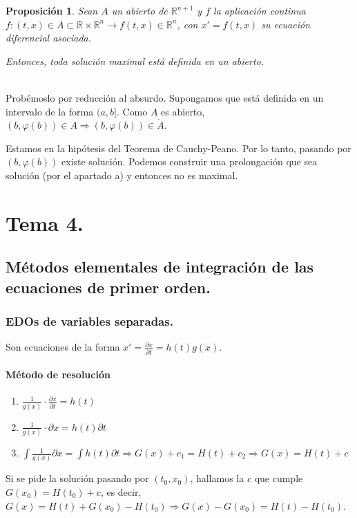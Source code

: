 \documentclass{article}
\makeatletter
\theoremstyle{theorem-style}  %
\newtheorem{proposition}[theorem]{Proposición}
\theoremstyle{definition-style}
\theoremstyle{example-style}
\renewenvironment{proof}[1][\proofname]{\par
	\pushQED{\qed}%
	\normalfont \topsep6\p@\@plus6\p@\relax
	\list{}{%
		\settowidth{\leftmargin}{\quad:\hskip\labelsep}%
		\setlength{\labelwidth}{0pt}%
		\setlength{\itemindent}{-\leftmargin}%
	}%
	\item[\hskip\labelsep\itshape#1\@addpunct{:}]\ignorespaces
}{%
	\popQED\endlist\@endpefalse
}
\makeatother
\begin{document}
\begin{proposition}
	Sean $ A $ un abierto de $ \mathbb{R}^{n+1} $ y $ f $ la aplicación continua $ f:(t,x)\in A\subset \mathbb{R}\times \mathbb{R}^n \longrightarrow f(t,x)\in \mathbb{R}^n $, con $  x'=f(t,x) $ su ecuación diferencial asociada. 
	
	Entonces, toda solución maximal está definida en un abierto.
\end{proposition}
\begin{proof}\ \\
	Probémoslo por reducción al absurdo. Supongamos que está definida en un intervalo de la forma $ (a,b] $.
	Como $ A $ es abierto, $ (b,\varphi(b))\in A \Rightarrow (b, \varphi(b)) \in \mathring{A} $.
	
	Estamos en la hipótesis del Teorema de Cauchy-Peano. Por lo tanto, pasando por $ (b, \varphi(b)) $ existe solución. Podemos construir una prolongación que sea solución (por el apartado a) y entonces no es maximal.
\end{proof}

\pagebreak
\section{Tema 4.}
\subsection{Métodos elementales de integración de las ecuaciones de primer orden.}
\subsubsection{EDOs de variables separadas.}
Son ecuaciones de la forma $ x'=\frac{\partial x}{\partial t}=h(t)g(x) $. 
\paragraph{Método de resolución}
\begin{enumerate}
	\item $ \frac{1}{g(x)}\cdot\frac{\partial x}{\partial t}=h(t) $
	\item $ \frac{1}{g(x)}\cdot\partial x=h(t)\partial t $
	\item $ \int \frac{1}{g(x)} \partial x= \int h(t) \partial t \Rightarrow G(x)+c_1=H(t)+c_2 \Rightarrow G(x)=H(t)+c$
\end{enumerate}
Si se pide la solución pasando por $ (t_0,x_0) $, hallamos la $ c $ que cumple $ G(x_0)=H(t_0)+c $, es decir, $ G(x)=H(t)+G(x_0)-H(t_0) \Rightarrow G(x)-G(x_0)=H(t)-H(t_0)$.
\end{document}
